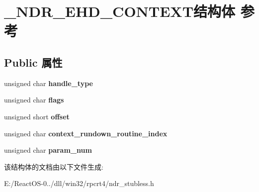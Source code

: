 \hypertarget{struct___n_d_r___e_h_d___c_o_n_t_e_x_t}{}\section{\+\_\+\+N\+D\+R\+\_\+\+E\+H\+D\+\_\+\+C\+O\+N\+T\+E\+X\+T结构体 参考}
\label{struct___n_d_r___e_h_d___c_o_n_t_e_x_t}
\subsection*{Public 属性}
\begin{DoxyCompactItemize}
\item 
\mbox{\label{struct___n_d_r___e_h_d___c_o_n_t_e_x_t_a1c4003aa0b29e00e2e1aaa27203b4d3e}} 
unsigned char {\bfseries handle\+\_\+type}
\item 
\mbox{\label{struct___n_d_r___e_h_d___c_o_n_t_e_x_t_a3a7ee2f41a8aecd05512aacda7c17f75}} 
unsigned char {\bfseries flags}
\item 
\mbox{\label{struct___n_d_r___e_h_d___c_o_n_t_e_x_t_ab93db57048b8dc1f61099d074e23306b}} 
unsigned short {\bfseries offset}
\item 
\mbox{\label{struct___n_d_r___e_h_d___c_o_n_t_e_x_t_a31460ab5aa0b48fce11404aada4482fd}} 
unsigned char {\bfseries context\+\_\+rundown\+\_\+routine\+\_\+index}
\item 
\mbox{\label{struct___n_d_r___e_h_d___c_o_n_t_e_x_t_a4a3f4adac49127c72cf27291e0ea8082}} 
unsigned char {\bfseries param\+\_\+num}
\end{DoxyCompactItemize}


该结构体的文档由以下文件生成\+:\begin{DoxyCompactItemize}
\item 
E\+:/\+React\+O\+S-\/0../dll/win32/rpcrt4/ndr\+\_\+stubless.\+h\end{DoxyCompactItemize}
